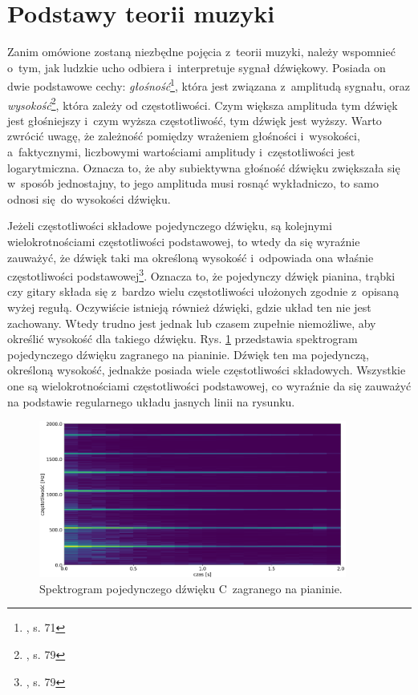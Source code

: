 \section{Podstawy teorii muzyki}

Zanim omówione zostaną niezbędne pojęcia z~teorii muzyki, należy wspomnieć o~tym, jak ludzkie ucho odbiera i~interpretuje sygnał dźwiękowy. Posiada on dwie podstawowe cechy: \emph{głośność}\footnote{\cite{lerch_introduction_2012}, s. 71}, która jest związana z~amplitudą sygnału, oraz \emph{wysokość}\footnote{\cite{lerch_introduction_2012}, s. 79}, która zależy od częstotliwości. Czym większa amplituda tym dźwięk jest głośniejszy i~czym wyższa częstotliwość, tym dźwięk jest wyższy. Warto zwrócić uwagę, że zależność pomiędzy wrażeniem głośności i~wysokości, a~faktycznymi, liczbowymi wartościami amplitudy i~częstotliwości jest logarytmiczna. Oznacza to, że aby subiektywna głośność dźwięku zwiększała się w~sposób jednostajny, to jego amplituda musi rosnąć wykładniczo, to samo odnosi się do wysokości dźwięku. 

Jeżeli częstotliwości składowe pojedynczego dźwięku, są kolejnymi wielokrotnościami częstotliwości podstawowej, to wtedy da się wyraźnie zauważyć, że dźwięk taki ma określoną wysokość i~odpowiada ona właśnie częstotliwości podstawowej\footnote{\cite{lerch_introduction_2012}, s. 79}. Oznacza to, że pojedynczy dźwięk pianina, trąbki czy gitary składa się z~bardzo wielu częstotliwości ułożonych zgodnie z~opisaną wyżej regułą. Oczywiście istnieją również dźwięki, gdzie układ ten nie jest zachowany. Wtedy trudno jest jednak lub czasem zupełnie niemożliwe, aby określić wysokość dla takiego dźwięku. Rys. \ref{fig:spektrogram_c} przedstawia spektrogram pojedynczego dźwięku zagranego na pianinie. Dźwięk ten ma pojedynczą, określoną wysokość, jednakże posiada wiele częstotliwości składowych. Wszystkie one są wielokrotnościami częstotliwości podstawowej, co wyraźnie da się zauważyć na podstawie regularnego układu jasnych linii na rysunku.

\begin{figure}[htb]
    \centering
    \includegraphics[width=0.9\textwidth]{images/spektrogram_c}
    \caption{Spektrogram pojedynczego dźwięku C~zagranego na pianinie.}
    \label{fig:spektrogram_c}
\end{figure}

